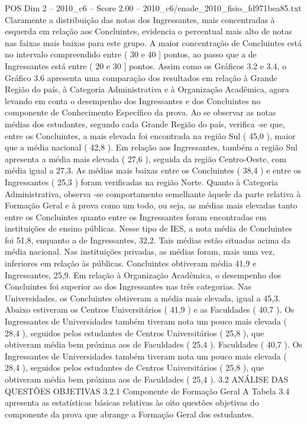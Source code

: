 \begin{textsample}{POS Dim 2 – 2010\_c6 – Score 2.00 – 2010\_c6/enade\_2010\_fisio\_fd971bea85.txt}
Claramente a distribuição das notas dos Ingressantes, mais concentradas à esquerda em relação aos Concluintes, evidencia o percentual mais alto de notas nas faixas mais baixas para este grupo.
A maior concentração de Concluintes está no intervalo compreendido entre ( 30 e 40 ] pontos, ao passo que a de Ingressantes está entre ( 20 e 30 ] pontos.
Assim como os Gráficos 3.2 e 3.4, o Gráfico 3.6 apresenta uma comparação dos resultados em relação à Grande Região do país, à Categoria Administrativa e à Organização Acadêmica, agora levando em conta o desempenho dos Ingressantes e dos Concluintes no componente de Conhecimento Específico da prova.
Ao se observar as notas médias dos estudantes, segundo cada Grande Região do país, verifica -se que, entre os Concluintes, a mais elevada foi encontrada na região Sul ( 45,0 ), maior que a média nacional ( 42,8 ).
Em relação aos Ingressantes, também a região Sul apresenta a média mais elevada ( 27,6 ), seguida da região Centro-Oeste, com média igual a 27,3.
As médias mais baixas entre os Concluintes ( 38,4 ) e entre os Ingressantes ( 25,3 ) foram verificadas na região Norte.
Quanto à Categoria Administrativa, observa -se comportamento semelhante àquele da parte relativa à Formação Geral e à prova como um todo, ou seja, as médias mais elevadas tanto entre os Concluintes quanto entre os Ingressantes foram encontradas em instituições de ensino públicas.
Nesse tipo de IES, a nota média de Concluintes foi 51,8, enquanto a de Ingressantes, 32,2.
Tais médias estão situadas acima da média nacional.
Nas instituições privadas, as médias foram, mais uma vez, inferiores em relação às públicas.
Concluintes obtiveram média 41,9 e Ingressantes, 25,9.
Em relação à Organização Acadêmica, o desempenho dos Concluintes foi superior ao dos Ingressantes nas três categorias.
Nas Universidades, os Concluintes obtiveram a média mais elevada, igual a 45,3.
Abaixo estiveram os Centros Universitários ( 41,9 ) e as Faculdades ( 40,7 ).
Os Ingressantes de Universidades também tiveram nota um pouco mais elevada ( 28,4 ), seguidos pelos estudantes de Centros Universitários ( 25,8 ), que obtiveram média bem próxima aos de Faculdades ( 25,4 ).
Faculdades ( 40,7 ).
Os Ingressantes de Universidades também tiveram nota um pouco mais elevada ( 28,4 ), seguidos pelos estudantes de Centros Universitários ( 25,8 ), que obtiveram média bem próxima aos de Faculdades ( 25,4 ). 3.2 ANÁLISE DAS QUESTÕES OBJETIVAS 3.2.1 Componente de Formação Geral A Tabela 3.4 apresenta as estatísticas básicas relativas às oito questões objetivas do componente da prova que abrange a Formação Geral dos estudantes.

\end{textsample}
